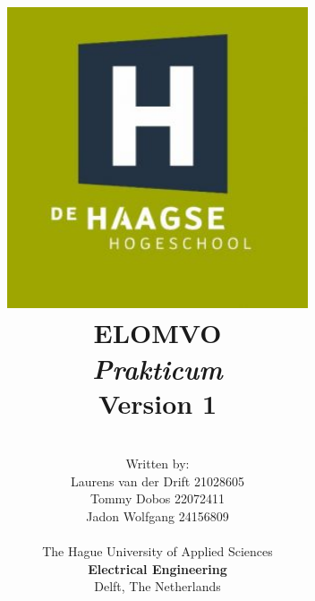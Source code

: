 \title{
\includegraphics[width=3.5in]{img/logo.jpg} \\
\vspace*{1in}
\textbf{ELOMVO}\\
\textit{Prakticum}\\
Version 1
}
\author{
\vspace*{0.5in} \\
  Written by:\\
  Laurens van der Drift 21028605\\
  Tommy Dobos 22072411\\
  Jadon Wolfgang 24156809\\
\vspace*{0.2in} \\
    The Hague University of Applied Sciences\\
    \textbf{Electrical Engineering}\\
    Delft, The Netherlands
   } 